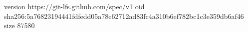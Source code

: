 version https://git-lfs.github.com/spec/v1
oid sha256:5a76823194441fdfedd05a78e62712ad83fc4a310b6ef782bc1c3e359db6af46
size 87580
